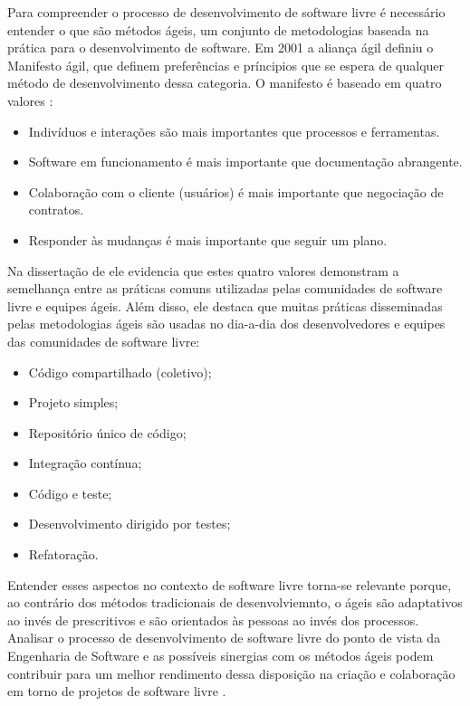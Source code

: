 Para compreender o processo de desenvolvimento de software livre é necessário entender o que são métodos ágeis, um conjunto de metodologias baseada na prática para o desenvolvimento de software. Em 2001 a aliança ágil definiu o Manifesto ágil, que definem preferências e príncipios que se espera de qualquer método de desenvolvimento dessa categoria. O manifesto é baseado em quatro valores \cite{beck2001agile}:
\begin{itemize}
\item Indivíduos e interações são mais importantes que processos e ferramentas.
\item Software em funcionamento é mais importante que documentação abrangente.
\item Colaboração com o cliente (usuários) é mais importante que negociação de contratos.
\item Responder às mudanças é mais importante que seguir um plano.
\end{itemize}

Na dissertação de  ele evidencia que estes quatro valores demonstram a semelhança entre as práticas comuns utilizadas pelas comunidades de software livre e equipes ágeis. Além disso, ele destaca que muitas práticas disseminadas pelas metodologias ágeis são usadas no dia-a-dia dos desenvolvedores e equipes das comunidades de software livre:
\begin{itemize}
\item Código compartilhado (coletivo);
\item Projeto simples;
\item Repositório único de código;
\item Integração contínua;
\item Código e teste;
\item Desenvolvimento dirigido por testes;
\item Refatoração.
\end{itemize}

Entender esses aspectos no contexto de software livre torna-se relevante porque, ao contrário dos métodos tradicionais de desenvolviemnto, o ágeis são adaptativos ao invés de prescritivos e são orientados às pessoas ao invés dos processos. Analisar o processo de desenvolvimento de software livre do ponto de vista da Engenharia de Software e as possíveis sinergias com os métodos ágeis podem contribuir para um melhor rendimento dessa disposição na criação e colaboração em torno de projetos de software livre \cite{meirelles2013}.

